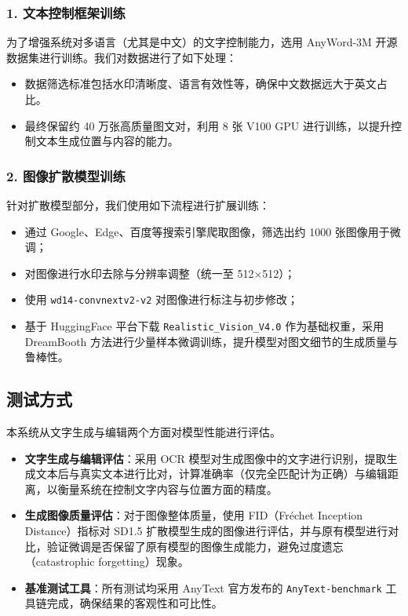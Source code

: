\documentclass[a4paper,12pt]{article}
\begin{document}
\subsubsection*{1. 文本控制框架训练}
为了增强系统对多语言（尤其是中文）的文字控制能力，选用 AnyWord-3M 开源数据集进行训练。我们对数据进行了如下处理：

\begin{itemize}
    \item 数据筛选标准包括水印清晰度、语言有效性等，确保中文数据远大于英文占比。
    \item 最终保留约 40 万张高质量图文对，利用 8 张 V100 GPU 进行训练，以提升控制文本生成位置与内容的能力。
\end{itemize}

\subsubsection*{2. 图像扩散模型训练}
针对扩散模型部分，我们使用如下流程进行扩展训练：

\begin{itemize}
    \item 通过 Google、Edge、百度等搜索引擎爬取图像，筛选出约 1000 张图像用于微调；
    \item 对图像进行水印去除与分辨率调整（统一至 512×512）；
    \item 使用 \texttt{wd14-convnextv2-v2} 对图像进行标注与初步修改；
    \item 基于 HuggingFace 平台下载 \texttt{Realistic\_Vision\_V4.0} 作为基础权重，采用 DreamBooth 方法进行少量样本微调训练，提升模型对图文细节的生成质量与鲁棒性。
\end{itemize}

\subsection{测试方式}

本系统从文字生成与编辑两个方面对模型性能进行评估。

\begin{itemize}
    \item \textbf{文字生成与编辑评估}：采用 OCR 模型对生成图像中的文字进行识别，提取生成文本后与真实文本进行比对，计算准确率（仅完全匹配计为正确）与编辑距离，以衡量系统在控制文字内容与位置方面的精度。
    
    \item \textbf{生成图像质量评估}：对于图像整体质量，使用 FID（Fréchet Inception Distance）指标对 SD1.5 扩散模型生成的图像进行评估，并与原有模型进行对比，验证微调是否保留了原有模型的图像生成能力，避免过度遗忘（catastrophic forgetting）现象。
    
    \item \textbf{基准测试工具}：所有测试均采用 AnyText 官方发布的 \texttt{AnyText-benchmark} 工具链完成，确保结果的客观性和可比性。
\end{itemize}
\end{document}
